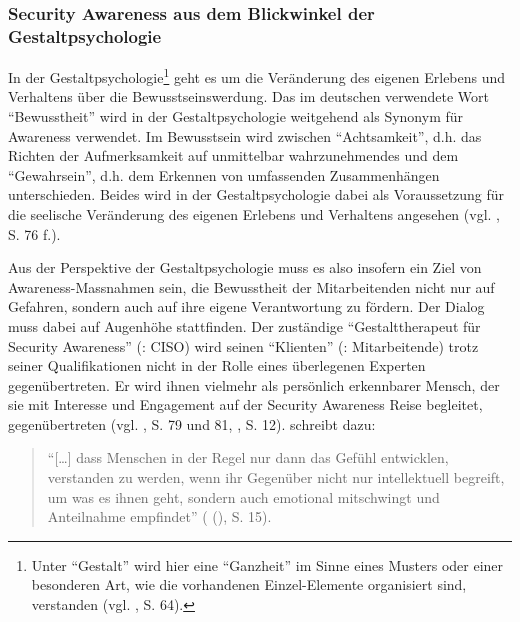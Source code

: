 \documentclass[../../main.tex]{subfiles}
\begin{document}
\subsubsection{Security Awareness aus dem Blickwinkel der Gestaltpsychologie}

\begin{sloppypar}
In der Gestaltpsychologie\footnote{Unter "`Gestalt"' wird hier eine "`Ganzheit"' im Sinne eines Musters oder einer besonderen Art, wie die vorhandenen Einzel-Elemente organisiert sind, verstanden (vgl. \citeauthor{staemmler_was_2009} \citeyear{staemmler_was_2009}, S. 64).} geht es um die Veränderung des eigenen Erlebens und Verhaltens über die Bewusstseinswerdung. Das im deutschen verwendete Wort "`Bewusstheit"' wird in der Gestaltpsychologie weitgehend als Synonym für Awareness verwendet. Im Bewusstsein wird zwischen "`Achtsamkeit"', d.h. das Richten der Aufmerksamkeit auf unmittelbar wahrzunehmendes und dem "`Gewahrsein"', d.h. dem Erkennen von umfassenden Zusammenhängen  unterschieden. Beides wird in der Gestaltpsychologie dabei als Voraussetzung für die seelische Veränderung des eigenen Erlebens und Verhaltens angesehen (vgl. \citeauthor{helisch_security_2009} \citeyear{helisch_security_2009}, S. 76 f.).

Aus der Perspektive der Gestaltpsychologie muss es also insofern ein Ziel von Awareness-Massnahmen sein, die Bewusstheit der Mitarbeitenden nicht nur auf Gefahren, sondern auch auf ihre eigene Verantwortung zu fördern. Der Dialog muss dabei auf Augenhöhe stattfinden. Der zuständige "`Gestalttherapeut für Security Awareness"' (\companyshort : CISO) wird seinen "`Klienten"' (\companyshort : Mitarbeitende) trotz seiner Qualifikationen nicht in der Rolle eines überlegenen Experten gegenübertreten. Er wird ihnen vielmehr als persönlich erkennbarer Mensch, der sie mit Interesse und Engagement auf der Security Awareness Reise begleitet, gegenübertreten (vgl. \citeauthor{helisch_security_2009} \citeyear{helisch_security_2009}, S. 79 und 81, \citeauthor{staemmler_was_2009} \citeyear{staemmler_was_2009}, S. 12). \citeauthor{staemmler_was_2009} schreibt dazu:

\begin{quote}
"`[\dots] dass Menschen in der Regel nur dann das Gefühl entwicklen, verstanden zu werden, wenn ihr Gegenüber nicht nur intellektuell begreift, um was es ihnen geht, sondern auch emotional mitschwingt und Anteilnahme empfindet"' (\citeauthor{staemmler_was_2009} (\citeyear{staemmler_was_2009}), S. 15).
\end{quote}

\end{sloppypar}
\end{document}
